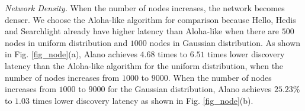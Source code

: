 \emph{Network Density.}
When the number of nodes increases, the network becomes denser. We
choose the Aloha-like algorithm for comparison because Hello, Hedis and
Searchlight already have higher latency than Aloha-like when there are
$500$ nodes in uniform distribution and $1000$ nodes in Gaussian
distribution.
As shown in Fig. \ref{fig_node}(a), Alano achieves $4.68$ times to
$6.51$ times lower discovery latency than the Aloha-like algorithm for
the uniform distribution, when the number of nodes increases from $1000$ to
$9000$.
When the number of nodes increases from $1000$ to $9000$ for the Gaussian
distribution, Alano achieves $25.23\%$ to $1.03$ times lower discovery
latency as shown in Fig. \ref{fig_node}(b).


